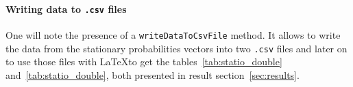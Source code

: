 \paragraph{Writing data to \texttt{.csv} files} %
\label{par:writing_data_to_csv_files}
One will note the presence of a \lstinline|writeDataToCsvFile|
method. It allows to write the data from the stationary probabilities
vectors into two \texttt{.csv} files and later on to use those
files with \LaTeX to get the tables~\ref{tab:statio_double}
and~\ref{tab:statio_double}, both presented in result section~\ref{sec:results}.


